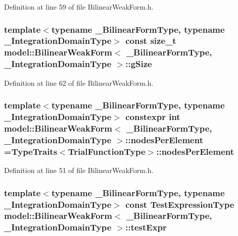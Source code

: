 Definition at line 59 of file Bilinear\+Weak\+Form.\+h.

\hypertarget{structmodel_1_1_bilinear_weak_form_a3c7dfa85132b98e728462f7cae7f87e0}{}
\subsubsection[{g\+Size}]{\setlength{\rightskip}{0pt plus 5cm}template$<$typename \+\_\+\+Bilinear\+Form\+Type, typename \+\_\+\+Integration\+Domain\+Type$>$ const size\+\_\+t {\bf model\+::\+Bilinear\+Weak\+Form}$<$ \+\_\+\+Bilinear\+Form\+Type, \+\_\+\+Integration\+Domain\+Type $>$\+::g\+Size}\label{structmodel_1_1_bilinear_weak_form_a3c7dfa85132b98e728462f7cae7f87e0}


Definition at line 62 of file Bilinear\+Weak\+Form.\+h.

\hypertarget{structmodel_1_1_bilinear_weak_form_a60eb39717dce6d992709e212544c3450}{}
\subsubsection[{nodes\+Per\+Element}]{\setlength{\rightskip}{0pt plus 5cm}template$<$typename \+\_\+\+Bilinear\+Form\+Type, typename \+\_\+\+Integration\+Domain\+Type$>$ constexpr int {\bf model\+::\+Bilinear\+Weak\+Form}$<$ \+\_\+\+Bilinear\+Form\+Type, \+\_\+\+Integration\+Domain\+Type $>$\+::nodes\+Per\+Element ={\bf Type\+Traits}$<${\bf Trial\+Function\+Type}$>$\+::nodes\+Per\+Element\hspace{0.3cm}{\ttfamily [static]}}\label{structmodel_1_1_bilinear_weak_form_a60eb39717dce6d992709e212544c3450}


Definition at line 51 of file Bilinear\+Weak\+Form.\+h.

\hypertarget{structmodel_1_1_bilinear_weak_form_a98885bcd66d794307c7abfb3ce543838}{}
\subsubsection[{test\+Expr}]{\setlength{\rightskip}{0pt plus 5cm}template$<$typename \+\_\+\+Bilinear\+Form\+Type, typename \+\_\+\+Integration\+Domain\+Type$>$ const {\bf Test\+Expression\+Type} {\bf model\+::\+Bilinear\+Weak\+Form}$<$ \+\_\+\+Bilinear\+Form\+Type, \+\_\+\+Integration\+Domain\+Type $>$\+::test\+Expr}\label{structmodel_1_1_bilinear_weak_form_a98885bcd66d794307c7abfb3ce543838}



